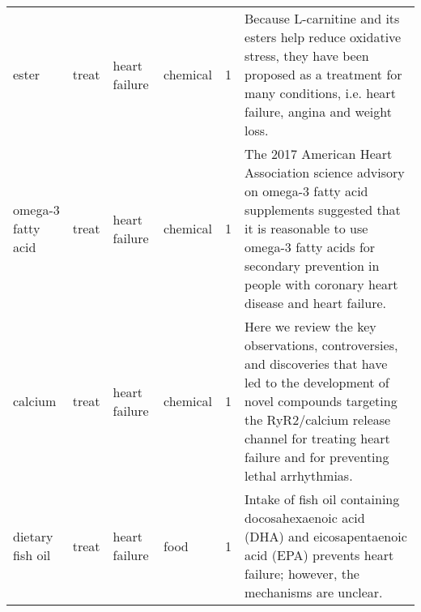 \begin{tabular}{llllrl}
                       ester &    treat &    heart failure &      chemical &               1 &                                                                                                                                                                                                                                                                                                                                                                                                                                                                   Because L-carnitine and its esters help reduce oxidative stress, they have been proposed as a treatment for many conditions, i.e. heart failure, angina and weight loss. \\
          omega-3 fatty acid &    treat &    heart failure &      chemical &               1 &                                                                                                                                                                                                                                                                                                                                                                                                        The 2017 American Heart Association science advisory on omega-3 fatty acid supplements suggested that it is reasonable to use omega-3 fatty acids for secondary prevention in people with coronary heart disease and heart failure. \\
                     calcium &    treat &    heart failure &      chemical &               1 &                                                                                                                                                                                                                                                                                                                                                                                                       Here we review the key observations, controversies, and discoveries that have led to the development of novel compounds targeting the RyR2/calcium release channel for treating heart failure and for preventing lethal arrhythmias. \\
            dietary fish oil &    treat &    heart failure &          food &               1 &                                                                                                                                                                                                                                                                                                                                                                                                                                                                                      Intake of fish oil containing docosahexaenoic acid (DHA) and eicosapentaenoic acid (EPA) prevents heart failure; however, the mechanisms are unclear. \\
\bottomrule
\end{tabular}
